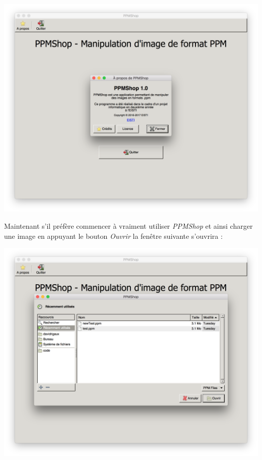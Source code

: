 \documentclass[12pt]{article}
\begin{document}
\begin{center}
\includegraphics[scale = 0.4]{aboutScreen}\\
\end{center}

Maintenant s'il préfère commencer à vraiment utiliser \textit{PPMShop} et ainsi charger une image en appuyant le bouton \textit{Ouvrir} la fenêtre suivante s'ouvrira : 

\begin{center}
\includegraphics[scale = 0.4]{loadScreen}\\
\end{center}
\end{document}
